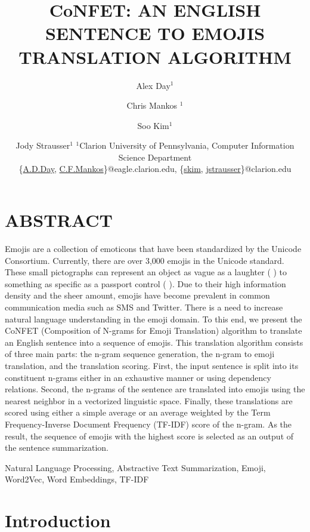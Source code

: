 \documentclass{article}[10]
\author{Alex Day$^1$ \and Chris Mankos $^{1}$ \and Soo Kim$^1$ \and Jody
  Strausser$^{1}$ \affiliations%
  $^1$Clarion University of Pennsylvania, Computer Information Science Department\\
  \emails%
  \{\href{mailto:A.D.Day@eagle.clarion.edu}{A.D.Day},
  \href{mailto:C.F.Mankos@eagle.clarion.edu}{C.F.Mankos}\}@eagle.clarion.edu,
  \{\href{mailto:skim@clarion.edu}{skim},
  \href{mailto:jstrausser@clarion.edu}{jstrausser}\}@clarion.edu }
\newcommand*{\img}[1]{%
  \raisebox{-.3\baselineskip}{%
    \texttt{[image: \#1]}%
  }%
} \title{{CoNFET:} AN ENGLISH SENTENCE TO EMOJIS TRANSLATION ALGORITHM}
\begin{document}
\maketitle

\titleformat{\section}{\normalfont\fontsize{10}{0}\bfseries}{\thesection}{1em}{}

\setlength{\parskip}{0em}
\section*{ABSTRACT}
\setlength{\parskip}{1em}
Emojis are a collection of emoticons that have been
standardized by the Unicode Consortium. Currently, there are over 3,000 emojis
in the Unicode standard. These small pictographs can represent an object as
vague as a laughter (\img{emojis/1f923.png}) to something as specific as a
passport control (\img{emojis/1f6c2.png}). Due to their high information density
and the sheer amount, emojis have become prevalent in common communication media
such as SMS and Twitter. There is a need to increase natural language
understanding in the emoji domain. To this end, we present the CoNFET
(Composition of N-grams for Emoji Translation) algorithm to translate an English
sentence into a sequence of emojis. This translation algorithm consists of three
main parts: the n-gram sequence generation, the n-gram to emoji translation, and
the translation scoring. First, the input sentence is split into its constituent
n-grams either in an exhaustive manner or using dependency relations. Second,
the n-grams of the sentence are translated into emojis using the nearest
neighbor in a vectorized linguistic space. Finally, these translations are
scored using either a simple average or an average weighted by the Term
Frequency-Inverse Document Frequency (TF-IDF) score of the n-gram. As the
result, the sequence of emojis with the highest score is selected as an output
of the sentence summarization.

\begin{keywords}
  Natural Language Processing, Abstractive Text Summarization, Emoji, Word2Vec,
  Word Embeddings, TF-IDF
\end{keywords}

\section{Introduction}
\end{document}
